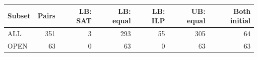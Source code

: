 \begin{tabular}{lrrrrrr}
\toprule
Subset & Pairs & LB: SAT & LB: equal & LB: ILP & UB: equal & Both initial\\
\midrule
ALL & 351 & 3 & 293 & 55 & 305 & 64\\
OPEN & 63 & 0 & 63 & 0 & 63 & 63\\
\bottomrule
\end{tabular}
